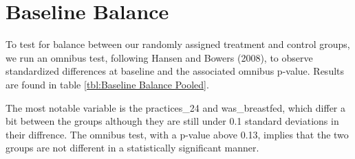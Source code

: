\documentclass{article}
\begin{document}
% 

% 


\printbibliography

\appendix

\section{Baseline Balance}

To test for balance between our randomly assigned treatment and control groups, we run an omnibus test, following Hansen and Bowers (2008), to observe standardized differences at baseline and the associated omnibus p-value. Results are found in table \ref{tbl:Baseline Balance Pooled}.

The most notable variable is the practices\_24 and was\_breastfed, which differ a bit between the groups although they are still under 0.1 standard deviations in their diffrence. The omnibus test, with a p-value above 0.13, implies that the two groups are not different in a statistically significant manner.
\end{document}
